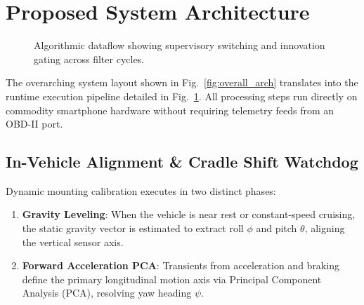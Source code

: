 \section{Proposed System Architecture}

\begin{figure}[t]
\centering
{}
\caption{Algorithmic dataflow showing supervisory switching and innovation gating across filter cycles.}
\label{fig:arch}
\end{figure}

The overarching system layout shown in Fig.~\ref{fig:overall_arch} translates into the runtime execution pipeline detailed in Fig.~\ref{fig:arch}. All processing steps run directly on commodity smartphone hardware without requiring telemetry feeds from an OBD-II port.

\subsection{In-Vehicle Alignment \& Cradle Shift Watchdog}

Dynamic mounting calibration executes in two distinct phases:
\begin{enumerate}
\item \textbf{Gravity Leveling}: When the vehicle is near rest or constant-speed cruising, the static gravity vector is estimated to extract roll $\phi$ and pitch $\theta$, aligning the vertical sensor axis.
\item \textbf{Forward Acceleration PCA}: Transients from acceleration and braking define the primary longitudinal motion axis via Principal Component Analysis (PCA), resolving yaw heading $\psi$.
\end{enumerate}

